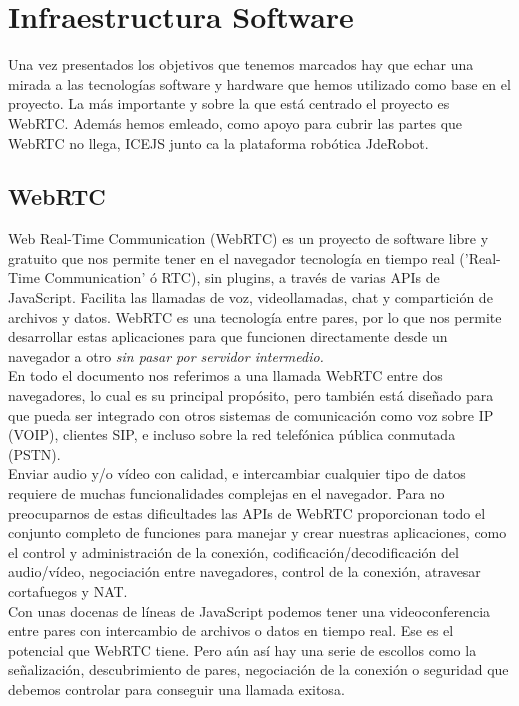 \chapter{Infraestructura Software} 

Una vez presentados los objetivos que tenemos marcados hay que echar una mirada a las tecnologías software y hardware que hemos utilizado como base en el proyecto. La más importante y sobre la que está centrado el proyecto es WebRTC. Además hemos emleado, como apoyo para cubrir las partes que WebRTC no llega, ICEJS junto ca la plataforma robótica JdeRobot.


\section{WebRTC}

Web Real-Time Communication (WebRTC) es un proyecto de software libre y gratuito que nos permite tener en el navegador tecnología en tiempo real ('Real-Time Communication' ó RTC), sin plugins, a través de varias APIs de JavaScript. Facilita las llamadas de voz, videollamadas, chat y compartición de archivos y datos. WebRTC es una tecnología entre pares, por lo que nos permite desarrollar estas aplicaciones para que funcionen directamente desde un navegador a otro \emph{sin pasar por servidor intermedio.}\\

En todo el documento nos referimos a una llamada WebRTC entre dos navegadores, lo cual es su principal propósito, pero también está diseñado para que pueda ser integrado con otros sistemas de comunicación como voz sobre IP (VOIP), clientes SIP, e incluso sobre la red telefónica pública conmutada (PSTN).\\

Enviar audio y/o vídeo con calidad, e intercambiar cualquier tipo de datos requiere de muchas funcionalidades complejas en el navegador. Para no preocuparnos de estas dificultades las APIs de WebRTC proporcionan todo el conjunto completo de funciones para manejar y crear nuestras aplicaciones, como el control y administración de la conexión, codificación/decodificación del audio/vídeo, negociación entre navegadores, control de la conexión, atravesar cortafuegos y NAT.\\

Con unas docenas de líneas de JavaScript podemos tener una videoconferencia entre pares con intercambio de archivos o datos en tiempo real. Ese es el potencial que WebRTC tiene. Pero aún así hay una serie de escollos como la señalización, descubrimiento de pares, negociación de la conexión o seguridad que debemos controlar para conseguir una llamada exitosa.\\

